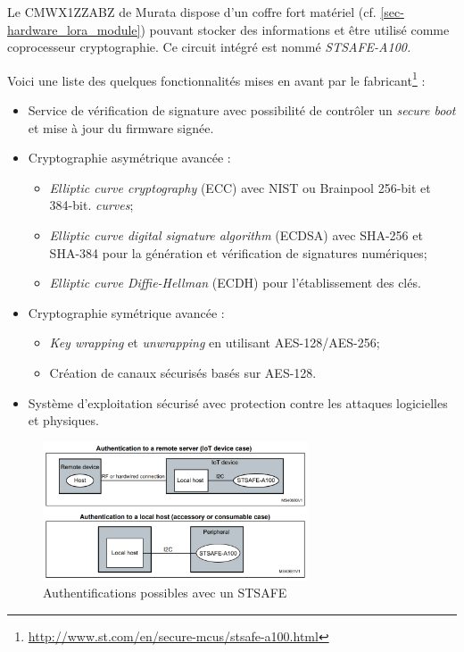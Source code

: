 Le CMWX1ZZABZ de Murata dispose d'un coffre fort matériel (cf. \cref{sec-hardware_lora_module}) pouvant stocker des informations et être utilisé comme coprocesseur cryptographie. Ce circuit intégré est nommé \textit{STSAFE-A100.} 

Voici une liste des quelques fonctionnalités mises en avant par le fabricant\footnote{\url{http://www.st.com/en/secure-mcus/stsafe-a100.html}} : 
\begin{itemize}
    \item Service de vérification de signature avec possibilité de contrôler un \textit{secure boot} et mise à jour du firmware signée.
    \item Cryptographie asymétrique avancée :
        \begin{itemize}
            \item \textit{Elliptic curve cryptography} (ECC) avec NIST ou Brainpool 256-bit et 384-bit. \textit{curves};
            
            \item \textit{Elliptic curve digital signature algorithm} (ECDSA) avec SHA-256 et SHA-384 pour la génération et vérification de signatures numériques;
            
            \item \textit{Elliptic curve Diffie-Hellman} (ECDH) pour l'établissement des clés.
        \end{itemize}
    \item Cryptographie symétrique avancée :
    \begin{itemize}
        \item \textit{Key wrapping} et \textit{unwrapping} en utilisant AES-128/AES-256;
        
        \item Création de canaux sécurisés basés sur AES-128.
    \end{itemize}
    
    \item Système d'exploitation sécurisé avec protection contre les attaques logicielles et physiques.
\end{itemize}

\begin{figure}[ht!]
    \centering
    \includegraphics[width=0.7\textwidth]{Figures/Security/stsafe_authentification.png}
    \caption{Authentifications possibles avec un STSAFE}
    \label{fig-stsafe_authentification}
\end{figure}

